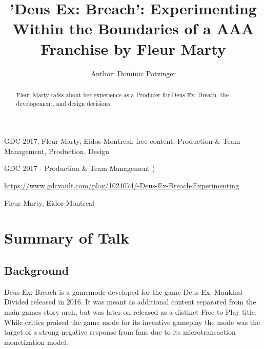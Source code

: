\documentclass[a4paper]{article}
\title{'Deus Ex: Breach': Experimenting Within the Boundaries of a AAA Franchise by Fleur Marty}
\author{Author: Dominic Potzinger}
\begin{document}
\maketitle

\begin{keywords} GDC 2017, Fleur Marty, Eidos-Montreal, free content, Production \& Team Management, Production, Design \end{keywords}

\begin{track} GDC 2017 - Production \& Team Management ) \end{track}

\begin{talkurl}  \url{https://www.gdcvault.com/play/1024074/-Deus-Ex-Breach-Experimenting} \end{talkurl}

\begin{speaker}Fleur Marty, Eidos-Montreal \end{speaker}


\begin{abstract}
Fleur Marty talks about her experience as a Producer for Deus Ex: Breach, the developement, and design decisions.

\end{abstract}

\section{Summary of Talk}

\subsection{Background}
Deus Ex: Breach is a gamemode developed for the game Deus Ex: Mankind Divided released in 2016. It was meant as additional content separated from the main games story arch, but was later on released as a distinct Free to Play title. While critics praised the game mode for its inventive gameplay the mode was the target of a strong negative response from fans due to its microtransaction monetization model. 
\end{document}
